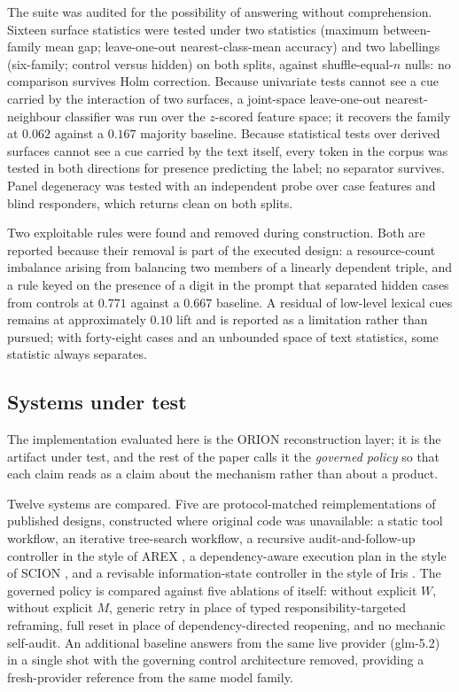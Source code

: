 The suite was audited for the possibility of answering without comprehension.
Sixteen surface statistics were tested under two statistics (maximum
between-family mean gap; leave-one-out nearest-class-mean accuracy) and two
labellings (six-family; control versus hidden) on both splits, against
shuffle-equal-$n$ nulls: no comparison survives Holm correction. Because
univariate tests cannot see a cue carried by the interaction of two surfaces, a
joint-space leave-one-out nearest-neighbour classifier was run over the
$z$-scored feature space; it recovers the family at $0.062$ against a $0.167$
majority baseline. Because statistical tests over derived surfaces cannot see a
cue carried by the text itself, every token in the corpus was tested in both
directions for presence predicting the label; no separator survives. Panel
degeneracy was tested with an independent probe over case features and blind
responders, which returns clean on both splits.

Two exploitable rules were found and removed during construction. Both are
reported because their removal is part of the executed design: a resource-count
imbalance arising from balancing two members of a linearly dependent triple, and
a rule keyed on the presence of a digit in the prompt that separated hidden
cases from controls at $0.771$ against a $0.667$ baseline. A residual of
low-level lexical cues remains at approximately $0.10$ lift and is reported as a
limitation rather than pursued; with forty-eight cases and an unbounded space of
text statistics, some statistic always separates.

\subsection{Systems under test}

The implementation evaluated here is the ORION reconstruction layer; it is the
artifact under test, and the rest of the paper calls it the \emph{governed
policy} so that each claim reads as a claim about the mechanism rather than
about a product.

Twelve systems are compared. Five are protocol-matched reimplementations of
published designs, constructed where original code was unavailable: a static
tool workflow, an iterative tree-search workflow, a recursive audit-and-follow-up
controller in the style of AREX \cite{arex2026}, a dependency-aware execution
plan in the style of SCION \cite{scion2026}, and a revisable
information-state controller in the style of Iris \cite{iris2026}. The governed
policy is compared against five ablations of itself: without explicit $W$,
without explicit $M$, generic retry in place of typed responsibility-targeted
reframing, full reset in place of dependency-directed reopening, and no mechanic
self-audit. An additional baseline answers from the same live provider
(glm-5.2) in a single shot with the governing control architecture removed,
providing a fresh-provider reference from the same model family.


